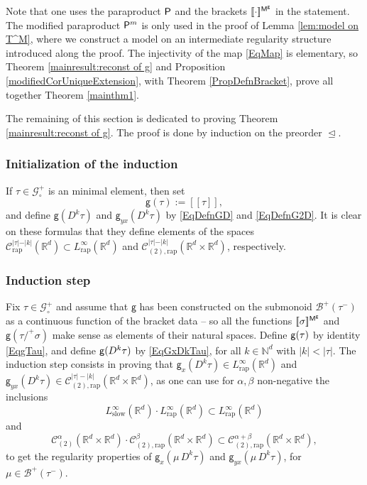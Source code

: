 \documentclass[JEP,XML,SOM,Unicode,published]{cedram}
\theoremstyle{plain}
\theoremstyle{definition}
\newcommand{\Brac}[1]{[\![#1]\!]}
\newcommand{\rap}{\mathrm{rap}}
\newcommand{\slow}{\mathrm{slow}}
\newcommand{\sfg}{\mathsf{g}}
\let\pord\trianglelefteq
\newcommand{\bbN}{\mathbb{N}}
\newcommand{\bbR}{\mathbb{R}}
\newcommand{\mcB}{\mathcal{B}}
\newcommand{\mcC}{\mathcal{C}}
\newcommand{\mcG}{\mathcal{G}}
\begin{document}
Note that one uses the paraproduct $\sf P$ and the brackets $\Brac{\cdot}^{\sf M^g}$ in the statement. The modified paraproduct ${\sf P}^m$ is only used in the proof of Lemma \ref{lem:model on T^M}, where we construct a model on an intermediate regularity structure introduced along the proof. The injectivity of the map \eqref{EqMap} is elementary, so Theorem \ref{mainresult:reconst of g} and Proposition \ref{modifiedCorUniqueExtension}, with Theorem \ref{PropDefnBracket}, prove all together Theorem \ref{mainthm1}.

The remaining of this section is dedicated to proving Theorem \ref{mainresult:reconst of g}. The proof is done by induction on the preorder $\pord$.

\subsubsection*{Initialization of the induction}
If $\tau\in\mcG_\circ^+$ is an minimal element, then set
\[
\sfg(\tau) := \Brac{\tau},
\]
and define $\sfg(D^k\tau)$ and $\sfg_{yx}(D^k\tau)$ by \eqref{EqDefnGD} and \eqref{EqDefnG2D}. It is clear on these formulas that they define elements of the spaces $\mcC^{\vert\tau\vert-\vert k\vert}_\rap(\bbR^d)\subset L^\infty_\rap(\bbR^d)$ and $\mcC^{\vert\tau\vert-\vert k\vert}_{(2),\rap}(\bbR^d\times\bbR^d)$, respectively.

\subsubsection*{Induction step}
Fix $\tau\in\mcG_\circ^+$ and assume that $\sfg$ has been constructed on the submonoid $\mcB^+(\tau^-)$ as a continuous function of the bracket data -- so all the functions $\Brac{\sigma}^{{\sf M}^\sfg}$ and ${\sfg}(\tau/^+\sigma)$ make sense as elements of their natural spaces. Define ${\sf g}(\tau)$ by identity \eqref{EqgTau}, and define ${\sf g}(D^k\tau)$ by \eqref{EqGxDkTau}, for all $k\in\bbN^d$ with $\vert k\vert<\vert\tau\vert$. The induction step consists in proving that $\sfg_x(D^k\tau)\in L_\rap^\infty(\bbR^d)$ and ${\sfg}_{yx}(D^k\tau)\in\mcC^{|\tau|-|k|}_{(2),\rap}(\bbR^d\times\bbR^d)$, as one can use for $\alpha,\beta$ non-negative the inclusions
\[
L_\slow^\infty(\bbR^d)\cdot L_\rap^\infty(\bbR^d)\subset L_\rap^\infty(\bbR^d)
\]
and
\[
\mcC_{(2)}^\alpha(\bbR^d\times\bbR^d)\cdot\mcC_{(2),\rap}^\beta(\bbR^d\times\bbR^d)\subset\mcC_{(2),\rap}^{\alpha+\beta}(\bbR^d\times\bbR^d),
\]
to get the regularity properties of $\sfg_x(\mu\,D^k\tau)$ and $\sfg_{yx}(\mu\,D^k\tau)$, for $\mu\in\mcB^+(\tau^-)$.
\end{document}
